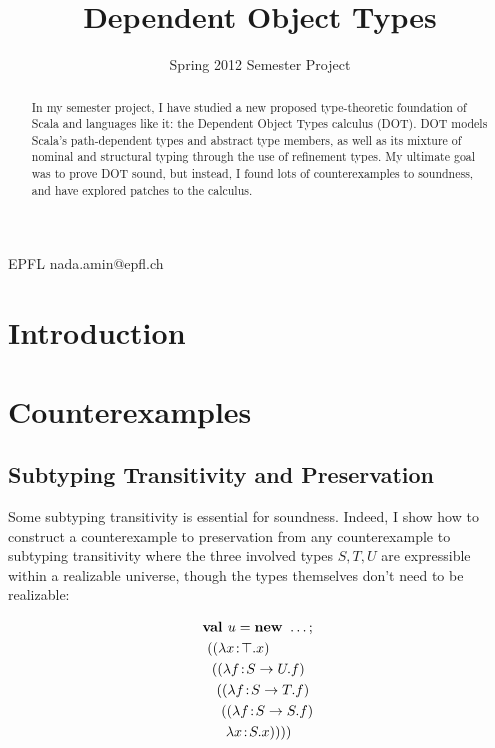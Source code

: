 \documentclass[preprint,9pt]{sigplanconf}
\begin{document}
\copyrightdata{[to be supplied]}


\title{Dependent Object Types}
\subtitle{Spring 2012 Semester Project}

           {EPFL}
           {nada.amin@epfl.ch}

\maketitle

\begin{abstract}
In my semester project, I have studied a new proposed type-theoretic
foundation of Scala and languages like it: the Dependent Object Types
calculus (DOT). DOT models Scala's path-dependent types and abstract
type members, as well as its mixture of nominal and structural typing
through the use of refinement types. My ultimate goal was to prove DOT
sound, but instead, I found lots of counterexamples to soundness, and
have explored patches to the calculus.
\end{abstract}


\section{Introduction}


\section{Counterexamples}

\subsection{Subtyping Transitivity and Preservation}\label{subpres}

Some subtyping transitivity is essential for soundness. Indeed, I show
how to construct a counterexample to preservation from any
counterexample to subtyping transitivity where the three involved
types $S, T, U$ are expressible within a realizable universe, though
the types themselves don't need to be realizable:

\begin{align*}
&\mlnew u \ldots {
\ \mlapp{\abs x \Top x}{
\ \ \mlapp{\abs f {S \tfun U} f}{
\ \ \ \mlapp{\abs f {S \tfun T} f}{
\ \ \ \ \mlapp{\abs f {S \tfun S} f}{
\ \ \  \ \ \abs x S x}}}}}
\end{align*}
\end{document}

